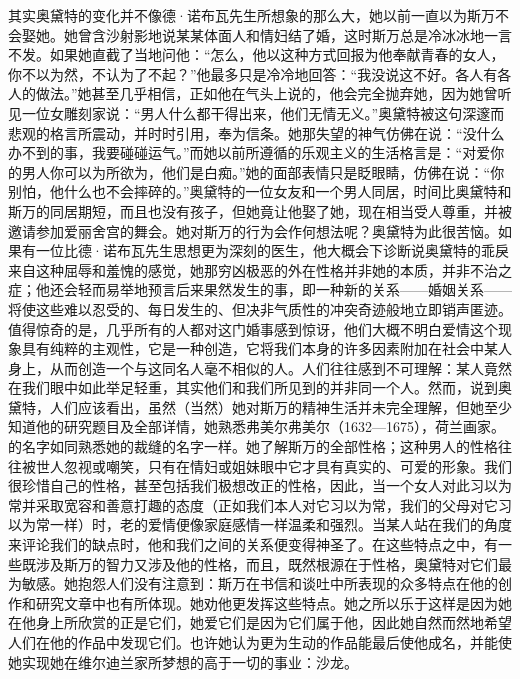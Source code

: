 \par 其实奥黛特的变化并不像德·诺布瓦先生所想象的那么大，她以前一直以为斯万不会娶她。她曾含沙射影地说某某体面人和情妇结了婚，这时斯万总是冷冰冰地一言不发。如果她直截了当地问他：“怎么，他以这种方式回报为他奉献青春的女人，你不以为然，不认为了不起？”他最多只是冷冷地回答：“我没说这不好。各人有各人的做法。”她甚至几乎相信，正如他在气头上说的，他会完全抛弃她，因为她曾听见一位女雕刻家说：“男人什么都干得出来，他们无情无义。”奥黛特被这句深邃而悲观的格言所震动，并时时引用，奉为信条。她那失望的神气仿佛在说：“没什么办不到的事，我要碰碰运气。”而她以前所遵循的乐观主义的生活格言是：“对爱你的男人你可以为所欲为，他们是白痴。”她的面部表情只是眨眼睛，仿佛在说：“你别怕，他什么也不会摔碎的。”奥黛特的一位女友和一个男人同居，时间比奥黛特和斯万的同居期短，而且也没有孩子，但她竟让他娶了她，现在相当受人尊重，并被邀请参加爱丽舍宫的舞会。她对斯万的行为会作何想法呢？奥黛特为此很苦恼。如果有一位比德·诺布瓦先生思想更为深刻的医生，他大概会下诊断说奥黛特的乖戾来自这种屈辱和羞愧的感觉，她那穷凶极恶的外在性格并非她的本质，并非不治之症；他还会轻而易举地预言后来果然发生的事，即一种新的关系——婚姻关系——将使这些难以忍受的、每日发生的、但决非气质性的冲突奇迹般地立即销声匿迹。值得惊奇的是，几乎所有的人都对这门婚事感到惊讶，他们大概不明白爱情这个现象具有纯粹的主观性，它是一种创造，它将我们本身的许多因素附加在社会中某人身上，从而创造一个与这同名人毫不相似的人。人们往往感到不可理解：某人竟然在我们眼中如此举足轻重，其实他们和我们所见到的并非同一个人。然而，说到奥黛特，人们应该看出，虽然（当然）她对斯万的精神生活并未完全理解，但她至少知道他的研究题目及全部详情，她熟悉弗美尔弗美尔（1632—1675），荷兰画家。的名字如同熟悉她的裁缝的名字一样。她了解斯万的全部性格；这种男人的性格往往被世人忽视或嘲笑，只有在情妇或姐妹眼中它才具有真实的、可爱的形象。我们很珍惜自己的性格，甚至包括我们极想改正的性格，因此，当一个女人对此习以为常并采取宽容和善意打趣的态度（正如我们本人对它习以为常，我们的父母对它习以为常一样）时，老的爱情便像家庭感情一样温柔和强烈。当某人站在我们的角度来评论我们的缺点时，他和我们之间的关系便变得神圣了。在这些特点之中，有一些既涉及斯万的智力又涉及他的性格，而且，既然根源在于性格，奥黛特对它们最为敏感。她抱怨人们没有注意到：斯万在书信和谈吐中所表现的众多特点在他的创作和研究文章中也有所体现。她劝他更发挥这些特点。她之所以乐于这样是因为她在他身上所欣赏的正是它们，她爱它们是因为它们属于他，因此她自然而然地希望人们在他的作品中发现它们。也许她认为更为生动的作品能最后使他成名，并能使她实现她在维尔迪兰家所梦想的高于一切的事业：沙龙。
